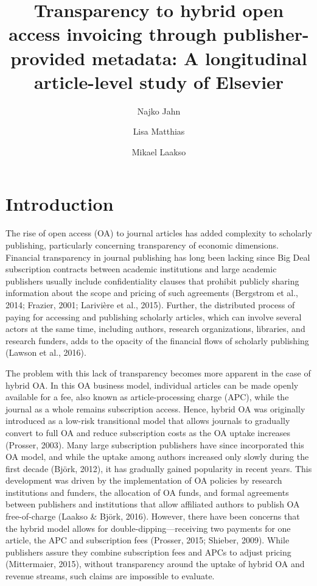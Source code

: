 \documentclass[a4paper,man,floatsintext,longtable,noextraspace,12pt]{apa6}
\title{Transparency to hybrid open access invoicing through publisher-provided metadata: A longitudinal article-level study of Elsevier}
\author{Najko Jahn}
\affiliation{State and University Library Göttingen, University of Göttingen, Germany}
\author{Lisa Matthias}
\affiliation{}
\author{Mikael Laakso}
\begin{document}
\maketitle

\hypertarget{introduction}{%
\section{Introduction}\label{introduction}}

The rise of open access (OA) to journal articles has added complexity to
scholarly publishing, particularly concerning transparency of economic
dimensions. Financial transparency in journal publishing has long been
lacking since Big Deal subscription contracts between academic
institutions and large academic publishers usually include
confidentiality clauses that prohibit publicly sharing information about
the scope and pricing of such agreements (Bergstrom et al., 2014;
Frazier, 2001; Larivière et al., 2015). Further, the distributed process
of paying for accessing and publishing scholarly articles, which can
involve several actors at the same time, including authors, research
organizations, libraries, and research funders, adds to the opacity of
the financial flows of scholarly publishing (Lawson et al., 2016).

The problem with this lack of transparency becomes more apparent in the
case of hybrid OA. In this OA business model, individual articles can be
made openly available for a fee, also known as article-processing charge
(APC), while the journal as a whole remains subscription access. Hence,
hybrid OA was originally introduced as a low-risk transitional model
that allows journals to gradually convert to full OA and reduce
subscription costs as the OA uptake increases (Prosser, 2003). Many
large subscription publishers have since incorporated this OA model, and
while the uptake among authors increased only slowly during the first
decade (Björk, 2012), it has gradually gained popularity in recent
years. This development was driven by the implementation of OA policies
by research institutions and funders, the allocation of OA funds, and
formal agreements between publishers and institutions that allow
affiliated authors to publish OA free-of-charge (Laakso \& Björk, 2016).
However, there have been concerns that the hybrid model allows for
double-dipping---receiving two payments for one article, the APC and
subscription fees (Prosser, 2015; Shieber, 2009). While publishers
assure they combine subscription fees and APCs to adjust pricing
(Mittermaier, 2015), without transparency around the uptake of hybrid OA
and revenue streams, such claims are impossible to evaluate.
\end{document}

